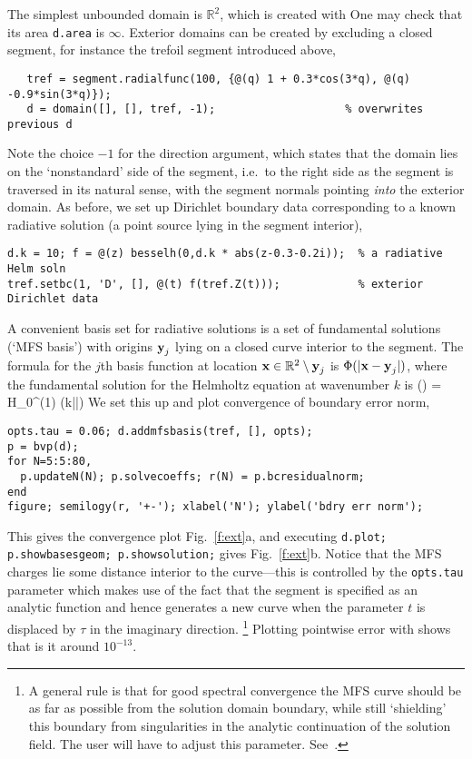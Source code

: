 The simplest unbounded domain is $\mathbb{R}^2$, which is created with
One may check that its area {\tt d.area} is $\infty$.
Exterior domains can be created by excluding a closed segment, for instance
the trefoil segment introduced above,
\begin{verbatim}
   tref = segment.radialfunc(100, {@(q) 1 + 0.3*cos(3*q), @(q) -0.9*sin(3*q)});
   d = domain([], [], tref, -1);                    % overwrites previous d
\end{verbatim}
Note the choice $-1$ for the direction argument, which states that
the domain lies on the `nonstandard' side of the segment, i.e.\
to the right side as the segment is traversed in its natural sense,
with the segment normals pointing {\em into} the exterior domain.
As before, we set up Dirichlet boundary data corresponding to a known
radiative solution (a point source lying in the segment interior),
\begin{verbatim}
d.k = 10; f = @(z) besselh(0,d.k * abs(z-0.3-0.2i));  % a radiative Helm soln
tref.setbc(1, 'D', [], @(t) f(tref.Z(t)));            % exterior Dirichlet data
\end{verbatim}
A convenient basis set for radiative solutions is a set of fundamental
solutions (`MFS basis') with origins $\textbf{y}_j$
lying on a closed curve interior to the segment.
The formula for the $j$th basis function at location
$\textbf{x}\in\mathbb{R}^2\setminus \textbf{y}_j$
is $\Phi(|\textbf{x}-\textbf{y}_j|)$, where
the fundamental solution for the Helmholtz equation at wavenumber $k$ is
\be
        \Phi(\bx) = H_0^{(1)} (k|\bx|)
\label{e:fund}
\ee
We set this up and plot convergence of boundary error norm,
\begin{verbatim}
opts.tau = 0.06; d.addmfsbasis(tref, [], opts);
p = bvp(d);
for N=5:5:80,
  p.updateN(N); p.solvecoeffs; r(N) = p.bcresidualnorm;
end
figure; semilogy(r, '+-'); xlabel('N'); ylabel('bdry err norm');
\end{verbatim}
This gives the convergence plot Fig.~\ref{f:ext}a, and
executing {\tt d.plot; p.showbasesgeom; p.showsolution;} gives
Fig.~\ref{f:ext}b. Notice that the MFS charges lie some distance interior
to the curve---this is controlled by the {\tt opts.tau} parameter which
makes use of the fact that the segment is specified as an analytic function
and hence generates a new curve when the parameter $t$ is displaced
by $\tau$ in the imaginary direction.%
  \footnote{A general rule is that for good spectral convergence
    the MFS curve should be
    as far as possible from the solution domain boundary, while still
    `shielding' this boundary from singularities in the analytic continuation
    of the solution field. The user will have to adjust this parameter.
    See~\cite{mfs}.}
Plotting pointwise error with
shows that is it around $10^{-13}$.


